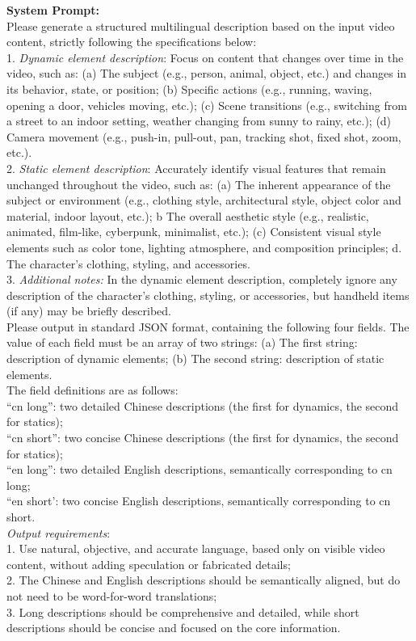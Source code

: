 \begin{tcolorbox}[
    colback=gray!10,
    colframe=gray!30,
    boxrule=0.3pt,
    arc=1.5pt,
    left=6pt,
    right=6pt,
    top=6pt,
    bottom=6pt
]
% 
\textbf{System Prompt:}
\\
Please generate a structured multilingual description based on the input video content, strictly following the specifications below:
\\
1. \textit{Dynamic element description}: Focus on content that changes over time in the video, such as: (a) The subject (e.g., person, animal, object, etc.) and changes in its behavior, state, or position; (b) Specific actions (e.g., running, waving, opening a door, vehicles moving, etc.); (c) Scene transitions (e.g., switching from a street to an indoor setting, weather changing from sunny to rainy, etc.); (d) Camera movement (e.g., push-in, pull-out, pan, tracking shot, fixed shot, zoom, etc.).
\\
2. \textit{Static element description}: Accurately identify visual features that remain unchanged throughout the video, such as: (a) The inherent appearance of the subject or environment (e.g., clothing style, architectural style, object color and material, indoor layout, etc.); b The overall aesthetic style (e.g., realistic, animated, film-like, cyberpunk, minimalist, etc.); (c) Consistent visual style elements such as color tone, lighting atmosphere, and composition principles; d. The character’s clothing, styling, and accessories.
\\
3. \textit{Additional notes:} In the dynamic element description, completely ignore any description of the character’s clothing, styling, or accessories, but handheld items (if any) may be briefly described.
\\
Please output in standard JSON format, containing the following four fields. The value of each field must be an array of two strings: (a) The first string: description of dynamic elements; (b) The second string: description of static elements.
\\
The field definitions are as follows:
\\
``cn long'': two detailed Chinese descriptions (the first for dynamics, the second for statics);
\\
``cn short'': two concise Chinese descriptions (the first for dynamics, the second for statics);
\\
``en long'': two detailed English descriptions, semantically corresponding to cn long;
\\
``en short': two concise English descriptions, semantically corresponding to cn short.
\\
\textit{Output requirements}:
\\
1. Use natural, objective, and accurate language, based only on visible video content, without adding speculation or fabricated details;
\\
2. The Chinese and English descriptions should be semantically aligned, but do not need to be word-for-word translations;
\\
3. Long descriptions should be comprehensive and detailed, while short descriptions should be concise and focused on the core information.
\end{tcolorbox}


